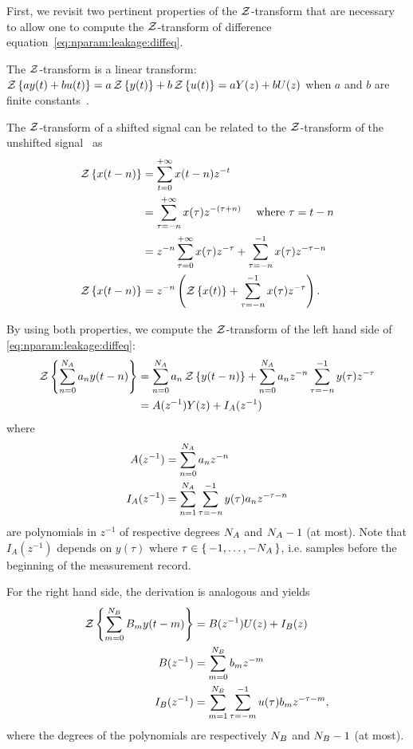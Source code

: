 First, we revisit two pertinent properties of the $\operatorname{\mathcal{Z}}$-transform that are necessary to allow one to compute the $\operatorname{\mathcal{Z}}$-transform of difference equation~\eqref{eq:nparam:leakage:diffeq}.
\begin{property}
The $\operatorname{\mathcal{Z}}$-transform is a linear transform: $\operatorname{\mathcal{Z}} \left\{ ay(t) + bu(t) \right\} = a \operatorname{\mathcal{Z}} \left\{ y(t) \right\} + b \operatorname{\mathcal{Z}} \left\{ u(t) \right\}= aY(z) + bU(z)$ when $a$ and $b$ are finite constants~\citep[Section 10.5.1]{Oppenheim1996}.
\end{property}
\begin{property}
The $\operatorname{\mathcal{Z}}$-transform of a shifted signal can be related to the $\operatorname{\mathcal{Z}}$-transform of the unshifted signal~\citep[Section 10.5.2]{Oppenheim1996} as
\begin{align}
  \operatorname{\mathcal{Z}} \left\{ x(t-n) \right\} 
  &= \sum_{t=0}^{+\infty} x(t-n) z^{-t} \\
  &= \sum_{\tau = -n}^{+\infty} x(\tau) z^{-(\tau + n)} \quad \text{ where } \tau = t - n\\
  &= z^{-n} \sum_{\tau = 0}^{+\infty} x(\tau) z^{-\tau} +  \sum_{\tau = -n}^{-1} x(\tau) z^{-\tau-n}\\
  \operatorname{\mathcal{Z}} \left\{ x(t-n) \right\} &= z^{-n} \left( \operatorname{\mathcal{Z}} \left\{ x(t) \right\} + \sum_{\tau = -n}^{-1} x(\tau) z^{-\tau} \right)
  \text{.}
\end{align}
\end{property}

By using both properties, we compute the $\operatorname{\mathcal{Z}}$-transform of the left hand side of \eqref{eq:nparam:leakage:diffeq}:
\begin{align}
  \operatorname{\mathcal{Z}} \left\{ \sum_{n=0}^{N_{A}} a_n y(t-n) \right\}
  &=
  \sum_{n=0}^{N_{A}} a_n \operatorname{\mathcal{Z}} \left\{ y(t-n) \right\}
  +\sum_{n=0}^{N_{A}} a_n z^{-n}  \sum_{\tau = -n}^{-1} y(\tau) z^{-\tau}  \\
  &=
  A(z^{-1}) Y(z) + I_A(z^{-1})
\end{align}
where
\begin{align}
  A(z^{-1}) &= \sum_{n=0}^{N_{A}} a_n z^{-n} \\
  I_A(z^{-1}) &= \sum_{n=1}^{N_{A}} \sum_{\tau = -n}^{-1} y(\tau) a_n z^{-\tau-n}
\end{align}
are polynomials in $z^{-1}$ of respective degrees $N_{A}$ and  $N_{A}-1$ (at most).
Note that $I_A(z^{-1})$ depends on $y(\tau)$ where $\tau \in \set{-1, \ldots, -\ensuremath{N_{A}}}$, i.e. samples before the beginning of the measurement record.

For the right hand side, the derivation is analogous and yields
\begin{align}
  \operatorname{\mathcal{Z}} \left\{ \sum_{m=0}^{N_{B}} B_m y(t-m) \right\} &=
  B(z^{-1}) U(z) + I_{B}(z)\\
  B(z^{-1}) &= \sum_{m=0}^{N_{B}} b_m z^{-m} \\
  I_B(z^{-1}) &= \sum_{m=1}^{N_{B}} \sum_{\tau = -m}^{-1} u(\tau) b_m z^{-\tau-m}
  \text{,}
\end{align}
where the degrees of the polynomials are respectively $N_{B}$ and $N_{B}-1$ (at most).

